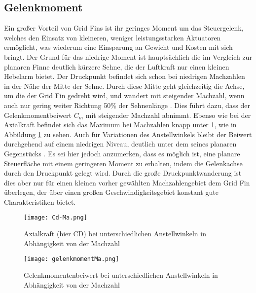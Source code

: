 \subsection{Gelenkmoment}
Ein großer Vorteil von Grid Fins ist ihr geringes Moment um das Steuergelenk, welches den Einsatz von kleineren, weniger leistungsstarken Aktuatoren ermöglicht, was wiederum eine Einsparung an Gewicht und Kosten mit sich bringt. Der Grund für das niedrige Moment ist hauptsächlich die im Vergleich zur planaren Finne deutlich kürzere Sehne, die der Luftkraft nur einen kleinen Hebelarm bietet. Der Druckpunkt befindet sich schon bei niedrigen Machzahlen in der Nähe der Mitte der Sehne. Durch diese Mitte geht gleichzeitig die Achse, um die der Grid Fin gedreht wird, und wandert mit steigender Machzahl, wenn auch nur gering weiter Richtung 50\% der Sehnenlänge \cite{vergleichPlanarNATO}. Dies führt dazu, dass der Gelenkmomentbeiwert $C_m$ mit steigender Machzahl abnimmt. Ebenso wie bei der Axialkraft befindet sich das Maximum bei Machzahlen knapp unter 1, wie in Abbildung \ref{abb_Mm-Ma} zu sehen. Auch für Variationen des Anstellwinkels bleibt der Beiwert durchgehend auf einem niedrigen Niveau, deutlich unter dem seines planaren Gegenstücks \cite{vergleichPlanarNATO}. Es sei hier jedoch anzumerken, dass es möglich ist, eine planare Steuerfläche mit einem geringeren Moment zu erhalten, indem die Gelenkachse durch den Druckpunkt gelegt wird. Durch die große Druckpunktwanderung ist dies aber nur für einen kleinen vorher gewählten Machzahlengebiet dem Grid Fin überlegen, der über einen großen Geschwindigkeitsgebiet konstant gute Charakteristiken bietet.
\begin{figure}[h]
	\begin{minipage}[t]{0.45\linewidth}
		\centering
		\texttt{[image: Cd-Ma.png]}
		\begin{flushright}
		\end{flushright}
		\caption{Axialkraft (hier CD) bei unterschiedlichen Anstellwinkeln in Abhängigkeit von der Machzahl}
		\label{abb_Cd-Ma}
	\end{minipage}
	\hfill
	\begin{minipage}[t]{0.45\linewidth}
		\centering
		\texttt{[image: gelenkmomentMa.png]}
		\begin{flushright}
				\flushbottom{Quelle: \cite{solver}}
		\end{flushright}
		\caption{Gelenkmomentenbeiwert bei unterschiedlichen Anstellwinkeln in Abhängigkeit von der Machzahl}
		\label{abb_Mm-Ma}
	\end{minipage}
\end{figure}
